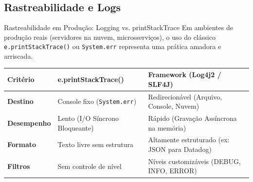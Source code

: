 \documentclass[9pt]{beamer}
\begin{document}
\subsection{Rastreabilidade e Logs}
\begin{frame}{Rastreabilidade em Produção: Logging vs. printStackTrace}
    Em ambientes de produção reais (servidores na nuvem, microsserviços), o uso do clássico \texttt{e.printStackTrace()} ou \texttt{System.err} representa uma prática amadora e arriscada.
    
    \vspace{0.2cm}
    
    \begin{center}
    \renewcommand{\arraystretch}{1.3}
    \scriptsize
    \begin{tabular}{|l|p{3.5cm}|p{3.5cm}|}
        \hline
        \textbf{Critério} & \textbf{e.printStackTrace()} & \textbf{Framework (Log4j2 / SLF4J)} \\
        \hline
        \textbf{Destino} & Console fixo (\texttt{System.err}) & Redirecionável (Arquivo, Console, Nuvem) \\
        \hline
        \textbf{Desempenho} & Lento (I/O Síncrono Bloqueante) & Rápido (Gravação Assíncrona na memória) \\
        \hline
        \textbf{Formato} & Texto livre sem estrutura & Altamente estruturado (ex: JSON para Datadog) \\
        \hline
        \textbf{Filtros} & Sem controle de nível & Níveis customizáveis (DEBUG, INFO, ERROR) \\
        \hline
    \end{tabular}
    \end{center}
\end{frame}
\end{document}

